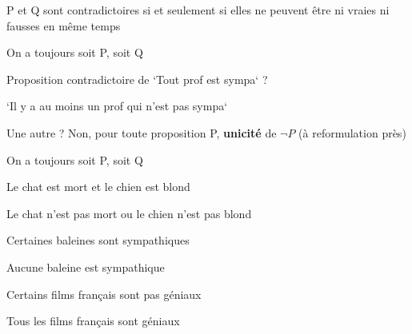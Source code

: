 \begin{frame}

			\begin{description}[labelindent=6pt,style=multiline,leftmargin=1.3in]
		 \setlength\itemsep{1em}
\item[Contradiction] P et Q sont contradictoires si et seulement si elles ne peuvent être ni vraies ni fausses en même temps 
	 \pause
\item[En français] On a toujours soit P, soit Q\pause 
\item[Exemple] Proposition contradictoire de `Tout prof est sympa` ?\pause 
\item[] `Il y a au moins un prof qui n'est pas sympa`\pause
\item[] Une autre ? \pause Non, pour toute proposition P, \textbf{unicité} de $\neg P$ (à reformulation près)
	\end{description}
\end{frame}



\begin{frame}

			\begin{description}[labelindent=6pt,style=multiline,leftmargin=1.3in]
		 \setlength\itemsep{1em}
\item[Contradiction] On a toujours soit P, soit Q
	 \pause
\item[Exemple] Le chat est mort et le chien est blond\pause 
\item[$\neg$] Le chat n'est pas mort ou le chien n'est pas blond\pause 
\item[Exemple] Certaines baleines sont sympathiques\pause
\item[$\neg$] Aucune baleine est sympathique \pause
\item[Exemple] Certains films français sont pas géniaux \pause
\item[$\neg$] Tous les films français sont géniaux 
	\end{description}
\end{frame}


